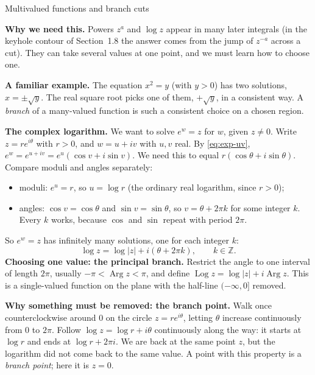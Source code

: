 \documentclass[11pt]{beamer}
\begin{document}
\begin{frame}[allowframebreaks=1.00]{Multivalued functions and branch cuts}
\footnotesize

\textbf{Why we need this.} Powers \(z^a\) and \(\log z\) appear in many later integrals (in the keyhole
contour of Section~1.8 the answer comes from the jump of \(z^{-a}\) across a cut). They can take
several values at one point, and we must learn how to choose one.

\textbf{A familiar example.} The equation \(x^2=y\) (with \(y>0\)) has two solutions,
\(x=\pm\sqrt y\). The real square root picks one of them, \(+\sqrt y\), in a consistent way. A
\emph{branch} of a many-valued function is such a consistent choice on a chosen region.

\textbf{The complex logarithm.} We want to solve \(e^w=z\) for \(w\), given \(z\ne0\). Write
\(z=re^{i\theta}\) with \(r>0\), and \(w=u+iv\) with \(u,v\) real. By \eqref{eq:exp-uv},
\(e^w=e^{u+iv}=e^u(\cos v+i\sin v)\). We need this to equal \(r(\cos\theta+i\sin\theta)\). Compare moduli and angles separately:
\begin{itemize}
  \item moduli: \(e^u=r\), so \(u=\log r\) (the ordinary real logarithm, since \(r>0\));
  \item angles: \(\cos v=\cos\theta\) and \(\sin v=\sin\theta\), so \(v=\theta+2\pi k\) for some
        integer \(k\). Every \(k\) works, because \(\cos\) and \(\sin\) repeat with period \(2\pi\).
\end{itemize}
So \(e^w=z\) has infinitely many solutions, one for each integer \(k\):
\begin{equation}
  \log z=\log|z|+i(\theta+2\pi k),\qquad k\in\mathbb Z.
  \label{eq:complex-log-values}
\end{equation}
\textbf{Choosing one value: the principal branch.} Restrict the angle to one interval of length
\(2\pi\), usually \(-\pi<\operatorname{Arg}z<\pi\), and define
\(\operatorname{Log}z=\log|z|+i\operatorname{Arg}z\). This is a single-valued function on the plane with the half-line \((-\infty,0]\) removed.
\par\framebreak\par
\textbf{Why something must be removed: the branch point.} Walk once counterclockwise around
\(0\) on the circle \(z=re^{i\theta}\), letting \(\theta\) increase continuously from \(0\) to \(2\pi\).
Follow \(\log z=\log r+i\theta\) continuously along the way: it starts at \(\log r\) and ends at
\(\log r+2\pi i\). We are back at the same point \(z\), but the logarithm did not come back to the
same value. A point with this property is a \emph{branch point}; here it is \(z=0\).


\end{frame}
\end{document}

